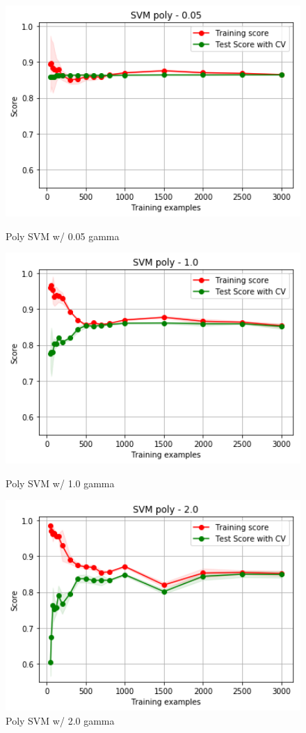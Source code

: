 \documentclass[h]{article}
\begin{document}
\begin{figure}[H]
      \includegraphics[width=1\textwidth,keepaspectratio]{1_svm_poly_05.png} 
      \caption*{Poly SVM w/ 0.05 gamma} 
   \endminipage\hfill
      \includegraphics[width=1\textwidth,keepaspectratio]{1_svm_poly_1.png} 
      \caption*{Poly SVM w/ 1.0 gamma} 
   \endminipage\hfill
      \includegraphics[width=1\textwidth,keepaspectratio]{1_svm_poly_2.png} 
      \caption*{Poly SVM w/ 2.0 gamma} 
   \endminipage\hfill
\end{figure}
\end{document}

